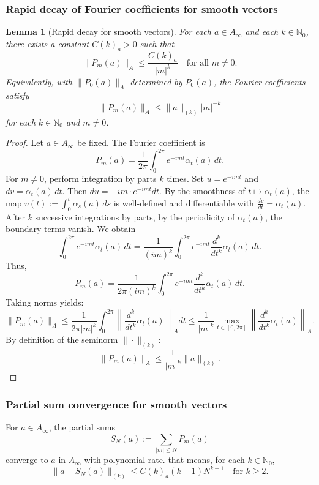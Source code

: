 \documentclass[11pt,reqno]{amsart}
\newtheorem{lemma}[theorem]{Lemma}
\theoremstyle{definition}
\numberwithin{equation}{section}
\begin{document}
\subsubsection{Rapid decay of Fourier coefficients for smooth vectors}
\begin{lemma}[Rapid decay for smooth vectors]\label{Rapid decay for smooth vectors}
For each $a \in A_{\infty}$ and each $k \in \mathbb{N}_0$, there exists a constant $C(k)_a > 0$ such that
\[
\|P_m(a)\|_A \le \frac{C(k)_a}{|m|^k} \quad \text{for all } m \neq 0.
\]
Equivalently, with $\|P_0(a)\|_A$ determined by $P_0(a)$, the Fourier coefficients satisfy
\[
\|P_m(a)\|_A \le \|a\|_{(k)}|m|^{-k}
\]
for each $k \in \mathbb{N}_0$ and $m \neq 0$.
\end{lemma}

\begin{proof}
Let $a \in A_{\infty}$ be fixed. The Fourier coefficient is
\[
P_m(a) = \frac{1}{2\pi} \int_0^{2\pi} e^{-imt}\alpha_t(a) \, dt.
\]
For $m \neq 0$, perform integration by parts $k$ times. Set $u = e^{-imt}$ and $dv = \alpha_t(a) \, dt$. Then $du = -im \cdot e^{-imt}dt$. By the smoothness of $t \mapsto \alpha_t(a)$, the map $v(t) := \int_0^t \alpha_s(a) \, ds$ is well-defined and differentiable with $\frac{dv}{dt} = \alpha_t(a)$. After $k$ successive integrations by parts, by the periodicity of $\alpha_t(a)$, the boundary terms vanish. We obtain
\[
\int_0^{2\pi} e^{-imt}\alpha_t(a) \, dt = \frac{1}{(im)^k} \int_0^{2\pi} e^{-imt} \frac{d^k}{dt^k}\alpha_t(a) \, dt.
\]
Thus,
\[
P_m(a) = \frac{1}{2\pi(im)^k} \int_0^{2\pi} e^{-imt} \frac{d^k}{dt^k}\alpha_t(a) \, dt.
\]
Taking norms yields:
\[
\|P_m(a)\|_A \le \frac{1}{2\pi|m|^k} \int_0^{2\pi} \left\| \frac{d^k}{dt^k}\alpha_t(a) \right\|_A dt \le \frac{1}{|m|^k} \max_{t \in [0, 2\pi]} \left\| \frac{d^k}{dt^k}\alpha_t(a) \right\|_A.
\]
By definition of the seminorm $\| \cdot \|_{(k)}$:
\[
\|P_m(a)\|_A \le \frac{1}{|m|^k}\|a\|_{(k)}.
\]
\end{proof}

\subsubsection{Partial sum convergence for smooth vectors}\label{Partial sum convergence for smooth vectors}
For $a \in A_{\infty}$, the partial sums
\[
S_N(a) := \sum_{|m| \le N} P_m(a)
\]
converge to $a$ in $A_{\infty}$ with polynomial rate. that means, for each $k \in \mathbb{N}_0$,
\[
\|a - S_N(a)\|_{(k)} \le C(k)_a (k-1) N^{k-1} \quad \text{for } k \ge 2.
\]
\end{document}
